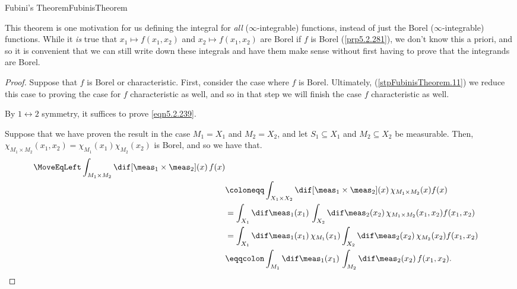 \begin{thm}{Fubini's Theorem}{FubinisTheorem}
\begin{rmk}
\end{rmk}
\begin{rmk}
This theorem is one motivation for us defining the integral for \emph{all} ($\infty$-integrable) functions, instead of just the Borel ($\infty$-integrable) functions.  While it \emph{is} true that $x_1\mapsto f(x_1,x_2)$ and $x_2\mapsto f(x_1,x_2)$ are Borel if $f$ is Borel (\cref{prp5.2.281}), we don't know this a priori, and so it is convenient that we can still write down these integrals and have them make sense without first having to prove that the integrands are Borel.
\end{rmk}
\begin{proof}
Suppose that $f$ is Borel or characteristic.  First, consider the case where $f$ is Borel.  Ultimately, (\cref{stpFubinisTheorem.11}) we reduce this case to proving the case for $f$ characteristic as well, and so in that step we will finish the case $f$ characteristic as well.

By $1\leftrightarrow 2$ symmetry, it suffices to prove \eqref{eqn5.2.239}.

Suppose that we have proven the result in the case $M_1=X_1$ and $M_2=X_2$, and let $S_1\subseteq X_1$ and $M_2\subseteq X_2$ be measurable.  Then, $\chi _{M_1\times M_2}(x_1,x_2)=\chi _{M_1}(x_1)\chi _{M_2}(x_2)$ is Borel, and so we have that.
\begin{equation*}
\begin{split}
\MoveEqLeft
\int _{M_1\times M_2}\dif [\meas _1\times \meas _2](x)\, f(x) \\
& \coloneqq \int _{X_1\times X_2}\dif [\meas _1\times \meas _2](x)\, \chi _{M_1\times M_2}(x)f(x) \\
& =\int _{X_1}\dif \meas _1(x_1)\, \int _{X_2}\dif \meas _2(x_2)\, \chi _{M_1\times M_2}(x_1,x_2)f(x_1,x_2) \\
& =\int _{X_1}\dif \meas _1(x_1)\, \chi _{M_1}(x_1)\int _{X_2}\dif \meas _2(x_2)\, \chi _{M_2}(x_2)f(x_1,x_2) \\
& \eqqcolon \int _{M_1}\dif \meas _1(x_1)\, \int _{M_2}\dif \meas _2(x_2)\, f(x_1,x_2).
\end{split}
\end{equation*}


\end{proof}
\end{thm}
